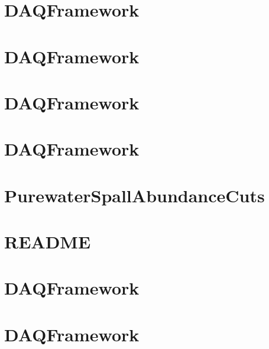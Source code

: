 \let\mypdfximage\pdfximage\def\pdfximage{\immediate\mypdfximage}\documentclass[twoside]{book}
\newcommand{\+}{\discretionary{\mbox{\scriptsize$\hookleftarrow$}}{}{}}
\begin{document}
\chapter{DAQFramework}
\label{md_UserTools_PostReconstructionNeutronCloudSelection_README}

\chapter{DAQFramework}
\label{md_UserTools_PreLoweReconstructionCuts_README}

\chapter{DAQFramework}
\label{md_UserTools_PreReconstructionNeutronCloudSelection_README}

\chapter{DAQFramework}
\label{md_UserTools_PrintEvent_README}

\chapter{Purewater\+Spall\+Abundance\+Cuts}
\label{md_UserTools_PurewaterSpallAbundanceCuts_README}

\chapter{README}
\label{md_UserTools_ReadMCInfo_README}

\chapter{DAQFramework}
\label{md_UserTools_ReadMCParticles_README}

\chapter{DAQFramework}
\label{md_UserTools_README}

\end{document}
